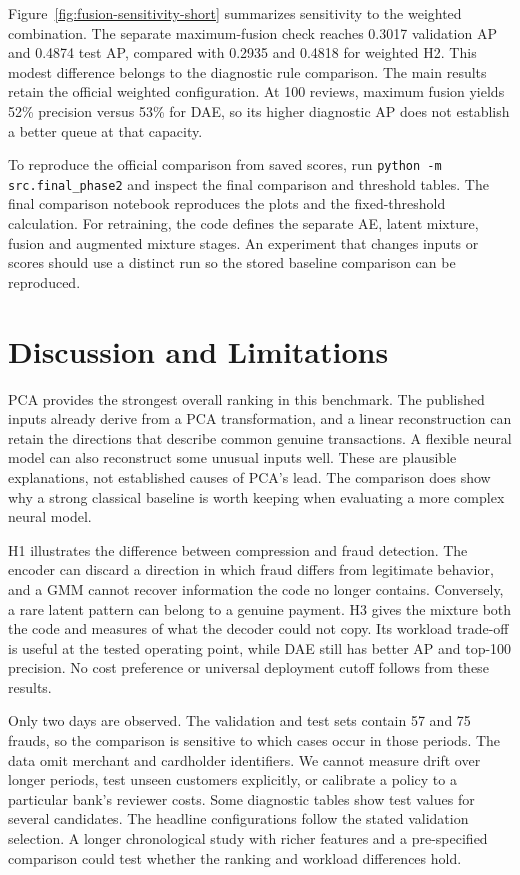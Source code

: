 Figure~\ref{fig:fusion-sensitivity-short} summarizes sensitivity to the weighted combination. The separate maximum-fusion check reaches 0.3017 validation AP and 0.4874 test AP, compared with 0.2935 and 0.4818 for weighted H2. This modest difference belongs to the diagnostic rule comparison. The main results retain the official weighted configuration. At 100 reviews, maximum fusion yields 52\% precision versus 53\% for DAE, so its higher diagnostic AP does not establish a better queue at that capacity.

To reproduce the official comparison from saved scores, run \texttt{python -m src.final\_phase2} and inspect the final comparison and threshold tables. The final comparison notebook reproduces the plots and the fixed-threshold calculation. For retraining, the code defines the separate AE, latent mixture, fusion and augmented mixture stages. An experiment that changes inputs or scores should use a distinct run so the stored baseline comparison can be reproduced.

\section{Discussion and Limitations}
PCA provides the strongest overall ranking in this benchmark. The published inputs already derive from a PCA transformation, and a linear reconstruction can retain the directions that describe common genuine transactions. A flexible neural model can also reconstruct some unusual inputs well. These are plausible explanations, not established causes of PCA's lead. The comparison does show why a strong classical baseline is worth keeping when evaluating a more complex neural model.

H1 illustrates the difference between compression and fraud detection. The encoder can discard a direction in which fraud differs from legitimate behavior, and a GMM cannot recover information the code no longer contains. Conversely, a rare latent pattern can belong to a genuine payment. H3 gives the mixture both the code and measures of what the decoder could not copy. Its workload trade-off is useful at the tested operating point, while DAE still has better AP and top-100 precision. No cost preference or universal deployment cutoff follows from these results.

Only two days are observed. The validation and test sets contain 57 and 75 frauds, so the comparison is sensitive to which cases occur in those periods. The data omit merchant and cardholder identifiers. We cannot measure drift over longer periods, test unseen customers explicitly, or calibrate a policy to a particular bank's reviewer costs. Some diagnostic tables show test values for several candidates. The headline configurations follow the stated validation selection. A longer chronological study with richer features and a pre-specified comparison could test whether the ranking and workload differences hold.


